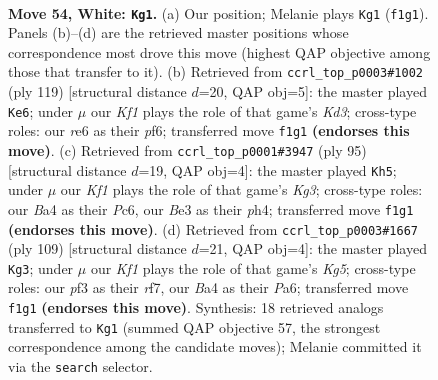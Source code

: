 \documentclass[11pt]{article}
\begin{document}
\clearpage

\begin{figure}[p]\centering
\begin{subfigure}{0.46\textwidth}\centering
\resizebox{\linewidth}{!}{%
\newchessgame
\chessboard[
  setfen={6k1/2R5/4r3/8/B3p2p/4Bp1P/b4P2/5K2 w - - 18 54},
  showmover=false,
  pgfstyle=straightmove, color=movearrow, markmove={f1-g1}
]}
\caption{}
\end{subfigure}\hfill
\begin{subfigure}{0.46\textwidth}\centering
\resizebox{\linewidth}{!}{%
\newchessgame
\chessboard[
  setfen={7B/7p/3k1P1P/8/p7/Pb1K4/1P6/8 b - - 18 60},
  showmover=false,
  pgfstyle=straightmove, color=movearrow, markmove={d6-e6}
]}
\caption{}
\end{subfigure}
\\[4pt]
\begin{subfigure}{0.46\textwidth}\centering
\resizebox{\linewidth}{!}{%
\newchessgame
\chessboard[
  setfen={8/8/2p3k1/5p2/p4P1P/P1K3P1/5B2/3b4 b - - 6 48},
  showmover=false,
  pgfstyle=straightmove, color=movearrow, markmove={g6-h5}
]}
\caption{}
\end{subfigure}\hfill
\begin{subfigure}{0.46\textwidth}\centering
\resizebox{\linewidth}{!}{%
\newchessgame
\chessboard[
  setfen={8/5R2/p2p4/P1b5/1pP3k1/8/KPB5/4r3 b - - 0 55},
  showmover=false,
  pgfstyle=straightmove, color=movearrow, markmove={g4-g3}
]}
\caption{}
\end{subfigure}
\caption{\textbf{Move 54, White: \texttt{Kg1}.} (a) Our position; Melanie plays \texttt{Kg1} (\texttt{f1g1}). Panels (b)--(d) are the retrieved master positions whose correspondence most drove this move (highest QAP objective among those that transfer to it). (b) Retrieved from \texttt{ccrl\_top\_p0003\#1002} (ply 119) [structural distance $d$=20, QAP obj=5]: the master played \texttt{Ke6}; under $\mu$ our \emph{Kf1} plays the role of that game's \emph{Kd3}; cross-type roles: our \emph{r}e6 as their \emph{p}f6; transferred move \texttt{f1g1} \textbf{(endorses this move)}. (c) Retrieved from \texttt{ccrl\_top\_p0001\#3947} (ply 95) [structural distance $d$=19, QAP obj=4]: the master played \texttt{Kh5}; under $\mu$ our \emph{Kf1} plays the role of that game's \emph{Kg3}; cross-type roles: our \emph{B}a4 as their \emph{P}c6, our \emph{B}e3 as their \emph{p}h4; transferred move \texttt{f1g1} \textbf{(endorses this move)}. (d) Retrieved from \texttt{ccrl\_top\_p0003\#1667} (ply 109) [structural distance $d$=21, QAP obj=4]: the master played \texttt{Kg3}; under $\mu$ our \emph{Kf1} plays the role of that game's \emph{Kg5}; cross-type roles: our \emph{p}f3 as their \emph{r}f7, our \emph{B}a4 as their \emph{P}a6; transferred move \texttt{f1g1} \textbf{(endorses this move)}. Synthesis: 18 retrieved analogs transferred to \texttt{Kg1} (summed QAP objective 57, the strongest correspondence among the candidate moves); Melanie committed it via the \texttt{search} selector.}
\label{fig:thought-m106}
\end{figure}
\end{document}

